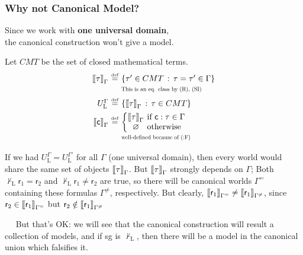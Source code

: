 \documentclass[xcolor=x11names]{beamer}
\renewcommand{\emph}[1]{\textbf{#1}}
\newcommand{\defegy}[1][.1]{\hspace{#1cm}\overset{\textup{\tiny def}}{=}\hspace{#1cm}}
\newcommand{\wintension}[3][]{{[}\hspace{-.46mm}{[} {#3}{]}\hspace{-.46mm}{]}^{\mathfrak{#1}}_{#2}}
\newcommand{\derives}[1][]{\vdash_{\mathrm{#1}}}
\newenvironment{tomb}[2][.1]{\arraycolsep=#1cm\begin{array}{#2}}{\end{array}}
\begin{document}
\begin{frame}[t]
	\frametitle{Why not Canonical Model?}
\footnotesize
Since we work with \emph{one universal domain}, \\ the canonical construction won't give a model.

\pause
\medskip

Let $CMT$ be the set of closed mathematical terms.
\[\begin{tomb}[0.01]{rcl}
\wintension{\Gamma}{\tau} &\defegy &\{\tau' \in CMT\, :\, \tau=\tau'\in \Gamma \}
\\&& \scalebox{.7}{\textup{This is an eq. class by (R), (SI)}}
\\[1ex] U_{\mathrm L}^{\Gamma}&\defegy &\{\wintension{\Gamma}{\tau} \, : \, \tau\in CMT\}
\\[1ex] \wintension{\Gamma}{\mathsf c} &\defegy &
\displaystyle \left\{
\begin{tomb}[0.01]{cl}
   \wintension{\Gamma}{\tau} & \textup{ if }  \mathsf c:\tau\in \Gamma
\\ \varnothing & \textup{ otherwise }
\end{tomb}\right.
\\&& \scalebox{.7}{\textup{well-defined because of (:F)}}
\end{tomb}\]

\pause

If we had $U_{\mathrm L}^{\Gamma}= U_{\mathrm{L}}^{\Gamma'}$ for all $\Gamma$ (one universal domain),
then every world would share the same set of objects $\wintension{\Gamma}\tau$. But $\wintension{\Gamma}\tau$ strongly depends on $\Gamma$;
Both $\not \derives[L] \mathsf r_1 = \mathsf r_2$ and $\not \derives[L] \mathsf r_1 \neq \mathsf r_2$ are true, so there will be canonical worlds $\Gamma^=$ containing these formulas $\Gamma^{\neq}$, respectively. But clearly, $\wintension{\Gamma^=}{\mathsf r_1}\neq \wintension{\Gamma^{\neq}}{\mathsf r_1}$, since ${\mathsf r_2}\in \wintension{\Gamma^=}{\mathsf r_1}$ but $\mathsf r_2\notin \wintension{\Gamma^{\neq}}{\mathsf r_1}$

$\quad$ But that's OK: we will see that the canonical construction will result a collection of models, and if sg is $\not \derives[L]$, then there will be a model in the canonical union which falsifies it.

\end{frame}
\end{document}
